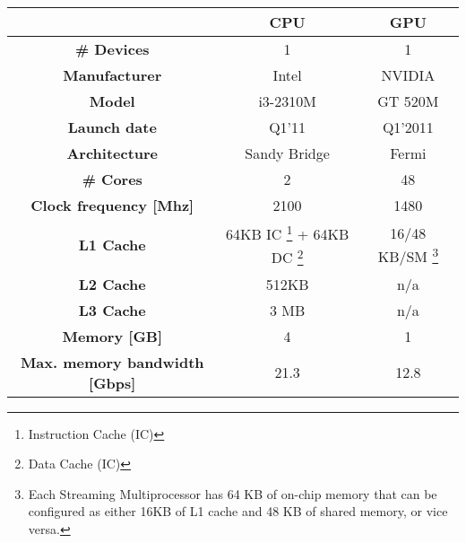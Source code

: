 \begin{minipage}[h]{\hsize}
	\centering
	\begin{tabular}{ccc}
		\toprule[2pt]
												 & \textbf{CPU}      & \textbf{GPU} \\ \midrule
		\textbf{\# Devices}                      & 1                 & 1            \\ 
		\textbf{Manufacturer}                    & Intel             & NVIDIA       \\ 
		\textbf{Model}                           & i3-2310M          & GT 520M      \\ 
		\textbf{Launch date}                     & Q1'11             & Q1'2011      \\ 
		\textbf{Architecture}                    & Sandy Bridge      & Fermi        \\ 
		\textbf{\# Cores}                        & 2                 & 48           \\ 
		\textbf{Clock frequency {[}Mhz{]}}       & 2100              & 1480         \\ 
		\textbf{L1 Cache}                        & 64KB IC \footnote{Instruction Cache (IC)} + 64KB DC \footnote{Data Cache (IC)} & 16/48 KB/SM \footnote{Each Streaming Multiprocessor has 64 KB of on-chip memory that can be configured as either 16KB of L1 cache and 48 KB of shared memory, or vice versa.}  \\ 
		\textbf{L2 Cache}                        & 512KB             & n/a          \\ 
		\textbf{L3 Cache}                        & 3 MB              & n/a          \\ 
		\textbf{Memory {[}GB{]}}                 & 4                 & 1            \\ 
		\textbf{Max. memory bandwidth {[}Gbps{]}} & 21.3              & 12.8        \\ 
		\bottomrule[2pt]
	\end{tabular}
	\label{tab:alpha}
\end{minipage}